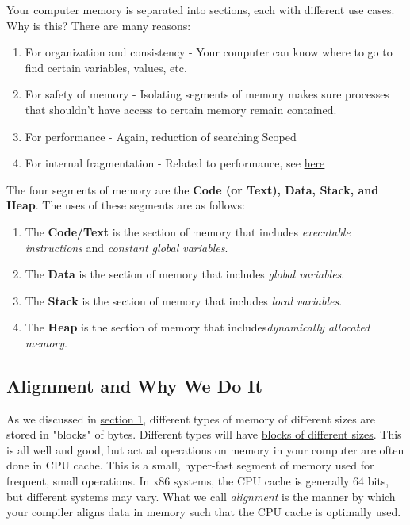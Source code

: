 \documentclass[a4paper, 12pt]{article}
\begin{document}
\begin{flushleft}
	Your computer memory is separated into sections, each with different use cases. Why is this? There are many reasons:
	\begin{enumerate}
		\item For organization and consistency - Your computer can know where to go to find certain variables, values, etc.
		\item For safety of memory - Isolating segments of memory makes sure processes that shouldn't have access to certain memory remain contained.
		\item For performance - Again, reduction of searching Scoped
		\item For internal fragmentation - Related to performance, see \href{https://www.geeksforgeeks.org/internal-fragmentation-in-os/}{here}
	\end{enumerate}
	The four segments of memory are the \textbf{Code (or Text), Data, Stack, and Heap}. The uses of these segments are as follows:
	\begin{enumerate}
		\item The \textbf{Code/Text} is the section of memory that includes \textit{executable instructions} and \textit{constant global variables}.
		\item The \textbf{Data} is the section of memory that includes \textit{global variables}.
		\item The \textbf{Stack} is the section of memory that includes \textit{local variables}.
		\item The \textbf{Heap} is the section of memory that includes{\textit{dynamically allocated memory}}.
	\end{enumerate}
\end{flushleft}

\subsection{Alignment and Why We Do It}

\begin{flushleft}
	As we discussed in \hyperref[subsec:bitsbytes]{section 1}, different types of memory of different sizes are stored in "blocks" of bytes.
	Different types will have \hyperref[tab:datatypes]{blocks of different sizes}.
	\newline\newline
	This is all well and good, but actual operations on memory in your computer are often done in CPU cache. This is a small, hyper-fast segment of memory used
	for frequent, small operations. In x86 systems, the CPU cache is generally 64 bits, but different systems may vary. What we call \textit{alignment} is the manner
	by which your compiler aligns data in memory such that the CPU cache is optimally used.
\end{flushleft}
\end{document}
